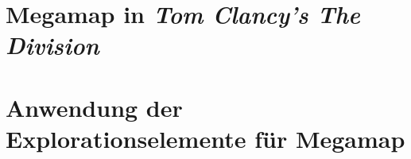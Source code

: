 \section{Megamap in \emph{Tom Clancy's The Division}}

\section{Anwendung der Explorationselemente für Megamap}

%
\cleardoublepage
